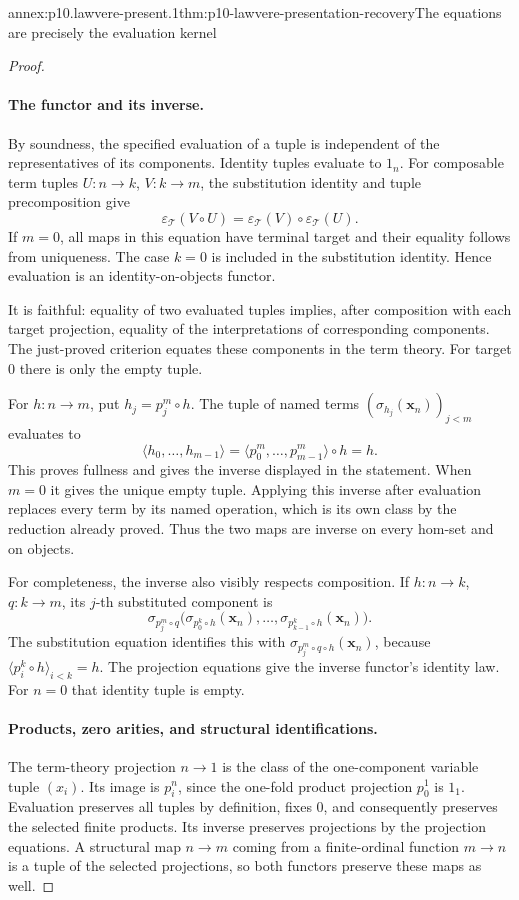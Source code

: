 \begin{annexitem}{annex:p10.lawvere-present.1}{thm:p10-lawvere-presentation-recovery}{The equations are precisely the evaluation kernel}
\begin{proof}
\paragraph{The functor and its inverse.}
By soundness, the specified evaluation of a tuple is independent
of the representatives of its components.
Identity tuples evaluate to \(1_n\).
For composable term tuples \(U:n\to k\), \(V:k\to m\), the
substitution identity and tuple precomposition give
\[
          \varepsilon_{\mathcal T}(V\circ U)
                     =\varepsilon_{\mathcal T}(V)
                                      \circ\varepsilon_{\mathcal T}(U).
\]
If \(m=0\), all maps in this equation have terminal target and
their equality follows from uniqueness.  The case \(k=0\)
is included in the substitution identity.
Hence evaluation is an identity-on-objects functor.

It is faithful: equality of two evaluated tuples implies,
after composition with each target projection, equality of
the interpretations of corresponding components.  The
just-proved criterion equates these components in the term
theory.  For target \(0\) there is only the empty tuple.

For \(h:n\to m\), put \(h_j=p_j^m\circ h\).
The tuple of named terms
\((\sigma_{h_j}(\mathbf x_n))_{j<m}\) evaluates to
\[
            \langle h_0,\ldots,h_{m-1}\rangle
               =\langle p_0^m,\ldots,p_{m-1}^m\rangle\circ h=h.
\]
This proves fullness and gives the inverse displayed in the
statement.  When \(m=0\) it gives the unique empty tuple.
Applying this inverse after evaluation replaces every term
by its named operation, which is its own class by the
reduction already proved.  Thus the two maps are inverse on
every hom-set and on objects.

For completeness, the inverse also visibly respects composition.
If \(h:n\to k\), \(q:k\to m\), its \(j\)-th substituted
component is
\[
 \sigma_{p_j^m\circ q}\bigl(
       \sigma_{p_0^k\circ h}(\mathbf x_n),\ldots,
       \sigma_{p_{k-1}^k\circ h}(\mathbf x_n)\bigr).
\]
The substitution equation identifies this with
\(\sigma_{p_j^m\circ q\circ h}(\mathbf x_n)\), because
\(\langle p_i^k\circ h\rangle_{i<k}=h\).
The projection equations give the inverse functor's identity
law.  For \(n=0\) that identity tuple is empty.

\paragraph{Products, zero arities, and structural identifications.}
The term-theory projection \(n\to1\) is the class of the
one-component variable tuple \((x_i)\).
Its image is \(p_i^n\), since the one-fold product projection
\(p_0^1\) is \(1_1\).  Evaluation preserves all tuples by
definition, fixes \(0\), and consequently preserves the
selected finite products.  Its inverse preserves projections
by the projection equations.  A structural map \(n\to m\)
coming from a finite-ordinal function \(m\to n\) is a tuple
of the selected projections, so both functors preserve these
maps as well.


\end{proof}
\end{annexitem}
